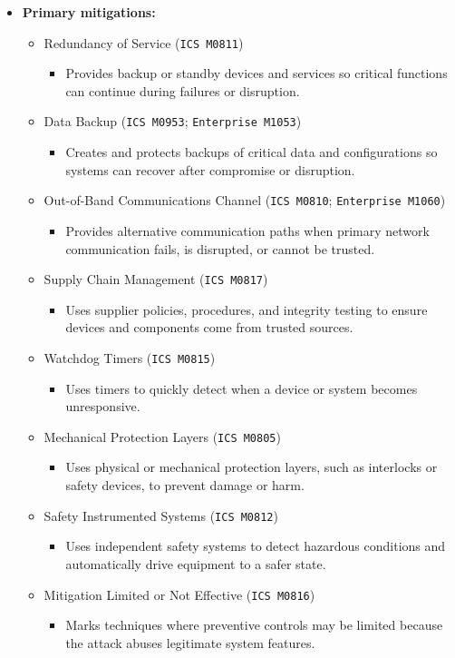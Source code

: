 \documentclass[10pt,a4paper,oneside]{report}
\begin{document}
\begin{itemize}
\item \textbf{Primary mitigations:}
\begin{itemize}
\item Redundancy of Service (\texttt{ICS M0811})
\begin{itemize}
\item Provides backup or standby devices and services so critical functions can continue during failures or disruption.
\end{itemize}
\item Data Backup (\texttt{ICS M0953}; \texttt{Enterprise M1053})
\begin{itemize}
\item Creates and protects backups of critical data and configurations so systems can recover after compromise or disruption.
\end{itemize}
\item Out-of-Band Communications Channel (\texttt{ICS M0810}; \texttt{Enterprise M1060})
\begin{itemize}
\item Provides alternative communication paths when primary network communication fails, is disrupted, or cannot be trusted.
\end{itemize}
\item Supply Chain Management (\texttt{ICS M0817})
\begin{itemize}
\item Uses supplier policies, procedures, and integrity testing to ensure devices and components come from trusted sources.
\end{itemize}
\item Watchdog Timers (\texttt{ICS M0815})
\begin{itemize}
\item Uses timers to quickly detect when a device or system becomes unresponsive.
\end{itemize}
\item Mechanical Protection Layers (\texttt{ICS M0805})
\begin{itemize}
\item Uses physical or mechanical protection layers, such as interlocks or safety devices, to prevent damage or harm.
\end{itemize}
\item Safety Instrumented Systems (\texttt{ICS M0812})
\begin{itemize}
\item Uses independent safety systems to detect hazardous conditions and automatically drive equipment to a safer state.
\end{itemize}
\item Mitigation Limited or Not Effective (\texttt{ICS M0816})
\begin{itemize}
\item Marks techniques where preventive controls may be limited because the attack abuses legitimate system features.
\end{itemize}
\end{itemize}
\end{itemize}
\end{document}
